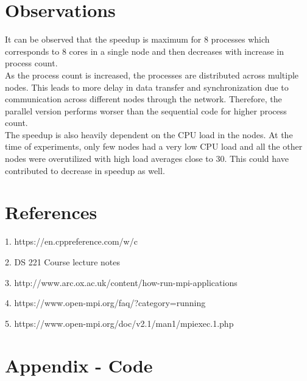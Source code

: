 \documentclass[11pt,a4paper,oneside]{article}
\begin{document}
    \section{Observations}
    It can be observed that the speedup is maximum for 8 processes which corresponds to 8 cores in a single node and then decreases with increase in process count. \\
    \newline
    As the process count is increased, the processes are distributed across multiple nodes. This leads to more delay in data transfer and synchronization due to communication across different nodes through the network. Therefore, the parallel version performs worser than the sequential code for higher process count. \\
    \newline
    The speedup is also heavily dependent on the CPU load in the nodes. At the time of experiments, only few nodes had a very low CPU load and all the other nodes were overutilized with high load averages close to 30. This could have contributed to decrease in speedup as well. \\
       
    
    \section{References}
    \begin{list}{}{}
    	\item 1. https://en.cppreference.com/w/c
    	\item 2. DS 221 Course lecture notes
    	\item 3. http://www.arc.ox.ac.uk/content/how-run-mpi-applications
    	\item 4. https://www.open-mpi.org/faq/?category=running
    	\item 5. https://www.open-mpi.org/doc/v2.1/man1/mpiexec.1.php
    \end{list}

    \section{Appendix - Code} 
    
\end{document}
